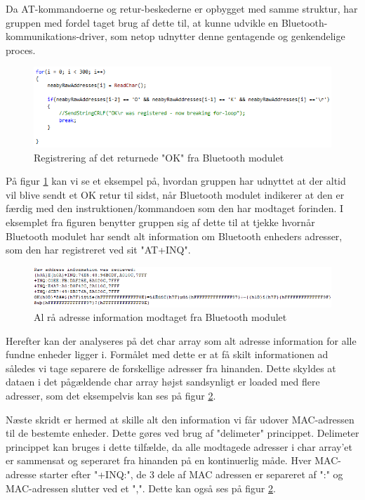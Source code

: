 Da AT-kommandoerne og retur-beskederne er opbygget med samme struktur, har gruppen med fordel taget brug af dette til, at kunne udvikle en Bluetooth-kommunikations-driver, som netop udnytter denne gentagende og genkendelige proces. 

\begin{figure}[H]
	\centering
	\includegraphics[width = 400 pt]{Img/OK_registrered.PNG}
	\caption{Registrering af det returnede "OK" fra Bluetooth modulet}
	\label{fig:OK_registrered}
\end{figure}

På figur \ref{fig:OK_registrered} kan vi se et eksempel på, hvordan gruppen har udnyttet at der altid vil blive sendt et OK retur til sidst, når Bluetooth modulet indikerer at den er færdig med den instruktionen/kommandoen som den har modtaget forinden. I eksemplet fra figuren benytter gruppen sig af dette til at tjekke hvornår Bluetooth modulet har sendt alt information om Bluetooth enheders adresser, som den har registreret ved sit "AT+INQ".

\begin{figure}[H]
	\centering
	\includegraphics[width = 500 pt]{Img/raw_address.PNG}
	\caption{Al rå adresse information modtaget fra Bluetooth modulet}
	\label{fig:raw_address}
\end{figure}

Herefter kan der analyseres på det char array som alt adresse information for alle fundne enheder ligger i. Formålet med dette er at få skilt informationen ad således vi tage separere de forskellige adresser fra hinanden. Dette skyldes at dataen i det pågældende char array højst sandsynligt er loaded med flere adresser, som det eksempelvis kan ses på figur \ref{fig:raw_address}.

Næste skridt er hermed at skille alt den information vi får udover MAC-adressen til de bestemte enheder. Dette gøres ved brug af "delimeter" princippet. Delimeter princippet kan bruges i dette tilfælde, da alle modtagede adresser i char array'et er sammensat og seperaret fra hinanden på en kontinuerlig måde. Hver MAC-adresse starter efter "+INQ:", de 3 dele af MAC adressen er separeret af ":" og MAC-adressen slutter ved et ",". Dette kan også ses på figur \ref{fig:raw_address}.


